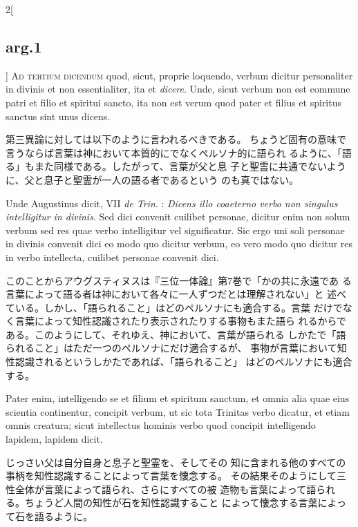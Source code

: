 \documentclass[paper=a4paper,fontsize=10pt,jafontsize=9pt,titlepage]{jlreq}
\begin{document}
\begin{paracol}{2}[\subsection{arg.1}]
{\scshape Ad tertium dicendum} quod, sicut, proprie loquendo, verbum dicitur
 personaliter in divinis et non essentialiter, ita et {\itshape dicere}. Unde,
 sicut verbum non est commune patri et filio et spiritui sancto, ita
 non est verum quod pater et filius et spiritus sanctus sint unus
 dicens.

\switchcolumn

第三異論に対しては以下のように言われるべきである。
ちょうど固有の意味で言うならば言葉は神において本質的にでなくペルソナ的に語られ
るように、「語る」もまた同様である。したがって、言葉が父と息
 子と聖霊に共通でないように、父と息子と聖霊が一人の語る者であるという
 のも真ではない。

\switchcolumn*

Unde Augustinus dicit, VII {\itshape de Trin}. : {\itshape Dicens illo coaeterno
 verbo non singulus intelligitur in divinis}. Sed dici convenit
 cuilibet personae, dicitur enim non solum verbum sed res quae verbo
 intelligitur vel significatur. Sic ergo uni soli personae in divinis
 convenit dici eo modo quo dicitur verbum, eo vero modo quo dicitur
 res in verbo intellecta, cuilibet personae convenit dici.

\switchcolumn

このことからアウグスティヌスは『三位一体論』第7巻で「かの共に永遠であ
 る言葉によって語る者は神において各々に一人ずつだとは理解されない」と
 述べている。しかし、「語られること」はどのペルソナにも適合する。言葉
 だけでなく言葉によって知性認識されたり表示されたりする事物もまた語ら
 れるからである。このようにして、それゆえ、神において、言葉が語られる
 しかたで「語られること」はただ一つのペルソナにだけ適合するが、
 事物が言葉において知性認識されるというしかたであれば、「語られること」
 はどのペルソナにも適合する。

\switchcolumn*

Pater enim,
 intelligendo se et filium et spiritum sanctum, et omnia alia quae
 eius scientia continentur, concipit verbum, ut sic tota Trinitas
 verbo dicatur, et etiam omnis creatura; sicut intellectus hominis
 verbo quod concipit intelligendo lapidem, lapidem dicit.

\switchcolumn

じっさい父は自分自身と息子と聖霊を、そしてその
 知に含まれる他のすべての事柄を知性認識することによって言葉を懐念する。
 その結果そのようにして三性全体が言葉によって語られ、さらにすべての被
 造物も言葉によって語られる。ちょうど人間の知性が石を知性認識すること
 によって懐念する言葉によって石を語るように。


\end{paracol}
\end{document}
